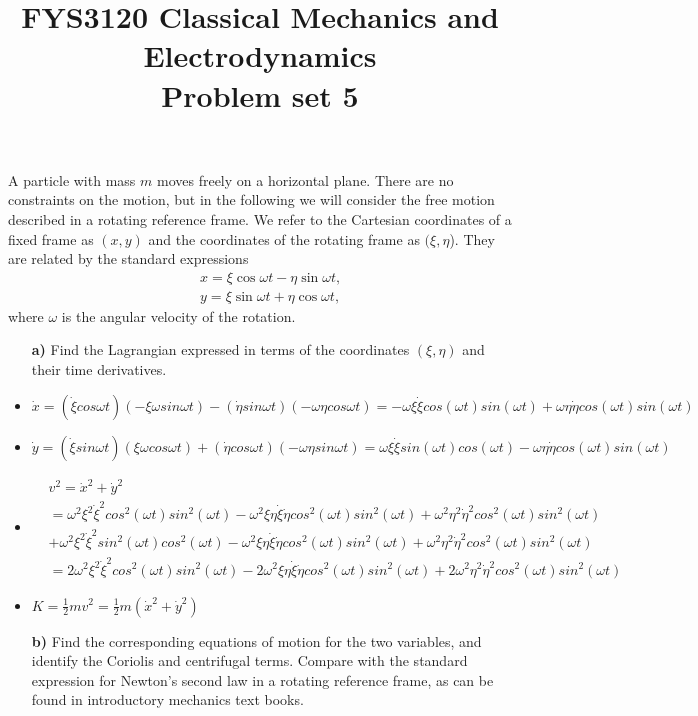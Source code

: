 \documentclass[11pt,a4paper]{report}
\title{FYS3120 Classical Mechanics and Electrodynamics\\ 
\vspace{15mm}Problem set 5}
\newcounter{excount}[chapter]
\newenvironment{exercise}[1][]{\addtocounter{excount}{1} \noindent {\bf Problem
    \arabic{excount} \ \ #1}\hspace{2mm}}{\vspace{4mm}}
\begin{document}
\maketitle


\begin{exercise}
A particle with mass $m$ moves freely on a horizontal plane. There are no constraints on the motion, but in the following we will consider the free motion described in a rotating reference frame. We refer to the Cartesian coordinates of a fixed frame as $(x,y)$ and the coordinates of the rotating frame as $(\xi,\eta$). They are related by the standard expressions
\begin{eqnarray}
&&x=\xi\cos\omega t-\eta\sin\omega t, \\
&&y=\xi\sin\omega t+\eta\cos\omega t,
\end{eqnarray}
where $\omega$ is the angular velocity of the rotation.

\begin{itemize}
\item[\bf a)] Find the Lagrangian expressed in terms of the coordinates $(\xi,\eta)$ and their time derivatives.
\item $\dot{x}=(\dot{\xi} cos \omega t)(-\xi\omega sin \omega t)-(\dot{\eta} sin \omega t)(-\omega \eta cos \omega t)=-\omega \xi \dot{\xi} cos(\omega t)sin(\omega t)+\omega\eta \dot{\eta} cos(\omega t)sin(\omega t)$
\item $\dot{y}=(\dot{\xi}sin\omega t)(\xi\omega cos \omega t)+(\dot{\eta} cos \omega t)(-\omega \eta sin \omega t)=\omega \xi \dot{\xi}sin(\omega t)cos (\omega t)-\omega \eta \dot{\eta} cos( \omega t)sin( \omega t) $

\item \begin{align*}
&v^2=\dot{x}^2+\dot{y}^2  \\
&=\omega^2 \xi^2 \dot{\xi}^2 cos^2(\omega t)sin^2(\omega t)-\omega^2 \xi \eta \dot{\xi} \dot{\eta}cos^2(\omega t) sin^2(\omega t)+\omega^2\eta^2 \dot{\eta}^2 cos^2(\omega t)sin^2(\omega t)\\
&+ \omega^2 \xi^2 \dot{\xi}^2sin^2(\omega t)cos^2 (\omega t)-\omega^2\xi \eta \dot{\xi} \dot{\eta} cos^2(\omega t)sin^2(\omega t)+\omega^2 \eta^2 \dot{\eta}^2 cos^2( \omega t)sin^2( \omega t)\\
&=2\omega^2 \xi^2 \dot{\xi}^2 cos^2(\omega t)sin^2(\omega t)-2\omega^2 \xi \eta \dot{\xi} \dot{\eta}cos^2(\omega t) sin^2(\omega t)+2\omega^2\eta^2 \dot{\eta}^2 cos^2(\omega t)sin^2(\omega t)
\end{align*}
\item $K=\frac{1}{2}mv^2=\frac{1}{2}m(\dot{x}^2+\dot{y}^2)$




\item[\bf b)] Find the corresponding equations of motion for the two variables, and identify the Coriolis and centrifugal terms.
Compare with the standard expression for Newton's second law in a rotating reference frame, as can be found in introductory mechanics text books.
\end{itemize}
\end{exercise}
\end{document}
